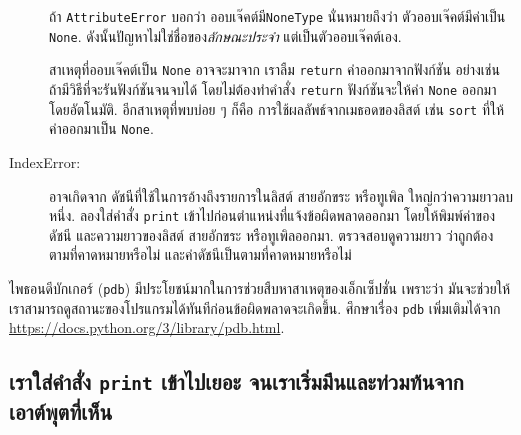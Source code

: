 \begin{description}
ถ้า \texttt{AttributeError}
บอกว่า
ออบเจ๊คต์มี\texttt{NoneType}
นั่นหมายถึงว่า ตัวออบเจ๊คต์มีค่าเป็น \texttt{None}.  
ดังนั้นปัญหาไม่ใช่ชื่อของ\textit{ลักษณะประจำ} แต่เป็นตัวออบเจ๊คต์เอง.

สาเหตุที่ออบเจ๊คต์เป็น \texttt{None}
อาจจะมาจาก เราลืม \texttt{return} ค่าออกมาจากฟังก์ชัน
อย่างเช่น ถ้ามีวิธีที่จะรันฟังก์ชันจนจบได้ โดยไม่ต้องทำคำสั่ง \texttt{return}
ฟังก์ชันจะให้ค่า \texttt{None} ออกมาโดยอัตโนมัติ.
อีกสาเหตุที่พบบ่อย ๆ ก็คือ การใช้ผลลัพธ์จากเมธอดของลิสต์ เช่น \texttt{sort} ที่ให้ค่าออกมาเป็น \texttt{None}.

\item[IndexError:] %
อาจเกิดจาก
ดัชนีที่ใช้ในการอ้างถึงรายการในลิสต์ สายอักขระ หรือทูเพิล ใหญ่กว่าความยาวลบหนึ่ง.
ลองใส่คำสั่ง \texttt{print} เข้าไปก่อนตำแหน่งที่แจ้งข้อผิดพลาดออกมา
โดยให้พิมพ์ค่าของดัชนี และความยาวของลิสต์ สายอักขระ หรือทูเพิลออกมา.
ตรวจสอบดูความยาว ว่าถูกต้องตามที่คาดหมายหรือไม่
และค่าดัชนีเป็นตามที่คาดหมายหรือไม่

\end{description}


ไพธอนดีบักเกอร์ (\texttt{pdb}) 
มีประโยชน์มากในการช่วยสืบหาสาเหตุของเอ็กเซ็ปชั่น
เพราะว่า มันจะช่วยให้เราสามารถดูสถานะของโปรแกรมได้ทันทีก่อนข้อผิดพลาดจะเกิดขึ้น.
ศึกษาเรื่อง \texttt{pdb} เพิ่มเติมได้จาก \url{https://docs.python.org/3/library/pdb.html}.

\subsection{เราใส่คำสั่ง \texttt{print} เข้าไปเยอะ จนเราเริ่มมึนและท่วมท้นจากเอาต์พุตที่เห็น}


